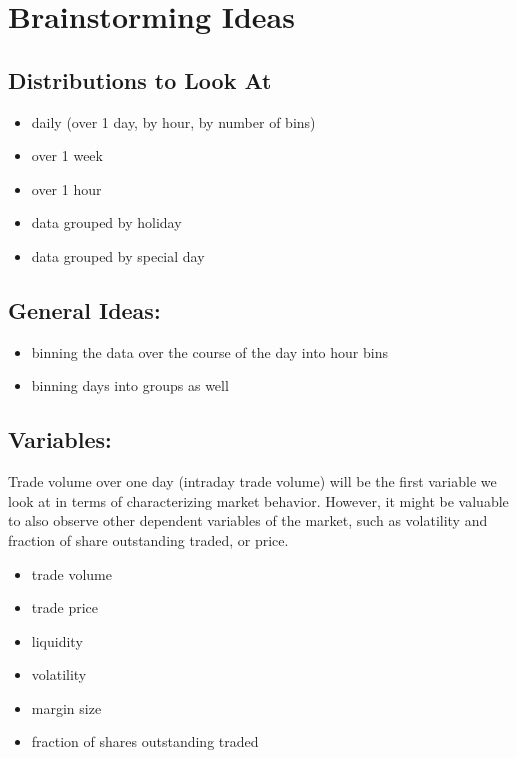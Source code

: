 \documentclass[11pt]{paper}
\begin{document}
\newpage
\section{Brainstorming Ideas}
\subsection{Distributions to Look At}
\begin{itemize}
\setlength{\itemsep}{0pt}
  \setlength{\parskip}{0pt}
\item daily (over 1 day, by hour, by number of bins)
\item over 1 week
\item over 1 hour
\item data grouped by holiday
\item data grouped by special day
\end{itemize}


\subsection{General Ideas:}
\begin{itemize}
\setlength{\itemsep}{0pt}
  \setlength{\parskip}{0pt}
\item binning the data over the course of the day into hour bins
\item binning days into groups as well
\end{itemize}


\subsection{Variables:}
Trade volume over one day (intraday trade volume) will be the first variable we look at in terms of characterizing market behavior. However, it might be valuable to also observe other dependent variables of the market, such as volatility and fraction of share outstanding traded, or price. 
\begin{itemize}
\setlength{\itemsep}{0pt}
  \setlength{\parskip}{0pt}
\item trade volume
\item trade price
\item liquidity
\item volatility
\item margin size
\item fraction of shares outstanding traded
\end{itemize}
\end{document}
